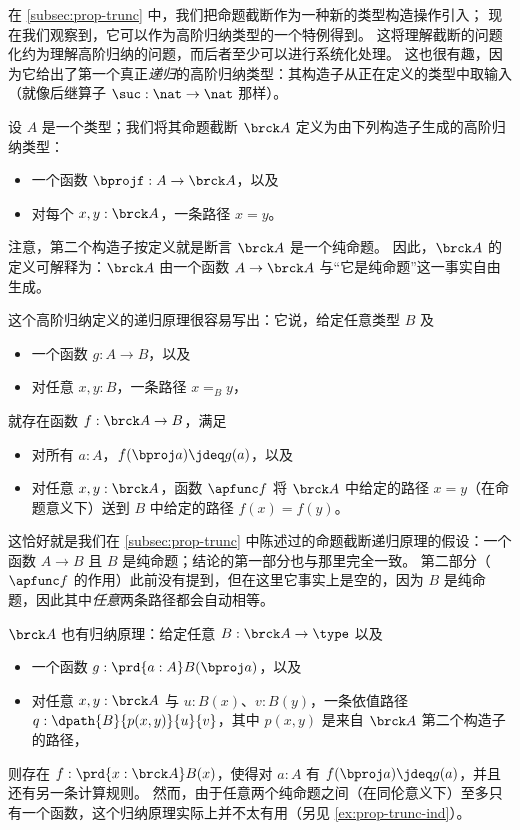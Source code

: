 %
在 \cref{subsec:prop-trunc} 中，我们把命题截断作为一种新的类型构造操作引入；
现在我们观察到，它可以作为高阶归纳类型的一个特例得到。
这将理解截断的问题化约为理解高阶归纳的问题，而后者至少可以进行系统化处理。
这也很有趣，因为它给出了第一个真正\emph{递归}的高阶归纳类型：其构造子从正在定义的类型中取输入（就像后继算子 $\suc:\nat\to\nat$ 那样）。

设 $A$ 是一个类型；我们将其命题截断 $\brck A$ 定义为由下列构造子生成的高阶归纳类型：
\begin{itemize}
\item 一个函数 $\bprojf : A \to \brck A$，以及
\item 对每个 $x,y:\brck A$，一条路径 $x=y$。
\end{itemize}
注意，第二个构造子按定义就是断言 $\brck A$ 是一个纯命题。
因此，$\brck A$ 的定义可解释为：$\brck A$ 由一个函数 $A\to\brck A$ 与“它是纯命题”这一事实自由生成。

这个高阶归纳定义的递归原理很容易写出：它说，给定任意类型 $B$ 及
\begin{itemize}
\item 一个函数 $g:A\to B$，以及
\item 对任意 $x,y:B$，一条路径 $x=_B y$，
\end{itemize}
就存在函数 $f:\brck A \to B$，满足
\begin{itemize}
\item 对所有 $a:A$，$f(\bproj a) \jdeq g(a)$，以及
\item 对任意 $x,y:\brck A$，函数 $\apfunc f$ 将 $\brck A$ 中给定的路径 $x=y$（在命题意义下）送到 $B$ 中给定的路径 $f(x) = f(y)$。
\end{itemize}
%
这恰好就是我们在 \cref{subsec:prop-trunc} 中陈述过的命题截断递归原理的假设：一个函数 $A\to B$ 且 $B$ 是纯命题；结论的第一部分也与那里完全一致。
第二部分（$\apfunc f$ 的作用）此前没有提到，但在这里它事实上是空的，因为 $B$ 是纯命题，因此其中\emph{任意}两条路径都会自动相等。

%
$\brck A$ 也有归纳原理：给定任意 $B:\brck A \to \type$ 以及
\begin{itemize}
\item 一个函数 $g:\prd{a:A} B(\bproj a)$，以及
\item 对任意 $x,y:\brck A$ 与 $u:B(x)$、$v:B(y)$，一条依值路径 $q:\dpath{B}{p(x,y)}{u}{v}$，其中 $p(x,y)$ 是来自 $\brck A$ 第二个构造子的路径，
\end{itemize}
则存在 $f:\prd{x:\brck A} B(x)$，使得对 $a:A$ 有 $f(\bproj a)\jdeq g(a)$，并且还有另一条计算规则。
然而，由于任意两个纯命题之间（在同伦意义下）至多只有一个函数，这个归纳原理实际上并不太有用（另见 \cref{ex:prop-trunc-ind}）。

